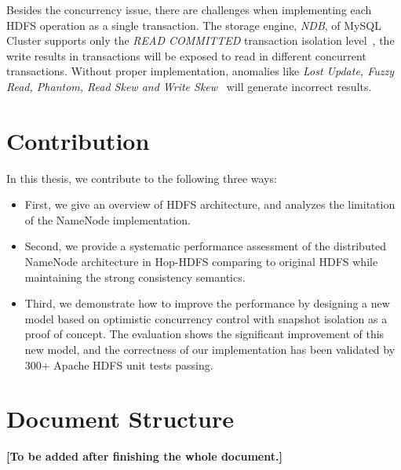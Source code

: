 \noindent Besides the concurrency issue, there are challenges when implementing each HDFS operation as a single transaction. The storage engine, \textit{NDB}, of MySQL Cluster supports only the \textit{READ COMMITTED} transaction isolation level~\cite{ndblimits}, the write results in transactions will be exposed to read in different concurrent transactions. Without proper implementation, anomalies like \textit{Lost Update, Fuzzy Read, Phantom, Read Skew and Write Skew}~\cite{berenson1995critique} will generate incorrect results.


\section{Contribution}

In this thesis, we contribute to the following three ways:

\begin{itemize}
	\item First, we give an overview of HDFS architecture, and analyzes the limitation of the NameNode implementation.
	\item Second, we provide a systematic performance assessment of the distributed NameNode architecture in Hop-HDFS comparing to original HDFS while maintaining the strong consistency semantics.
	\item Third, we demonstrate how to improve the performance by designing a new model based on optimistic concurrency control with snapshot isolation as a proof of concept. The evaluation shows the significant improvement of this new model, and the correctness of our implementation has been validated by 300+ Apache HDFS unit tests passing.
\end{itemize}


\section{Document Structure}

\textbf{[To be added after finishing the whole document.]}


